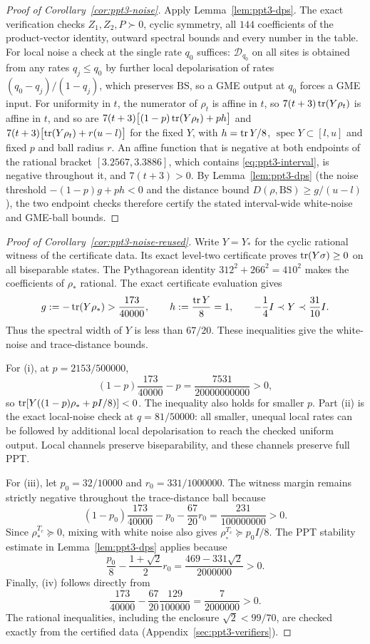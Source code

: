 \begin{proof}[Proof of Corollary~\ref{cor:ppt3-noise}]
Apply Lemma~\ref{lem:ppt3-dps}. The exact verification checks $Z_1,Z_2,P\succ0$, cyclic symmetry, all $144$
coefficients of the product-vector identity, outward spectral bounds and every number in the table. For local noise a
check at the single rate $q_0$ suffices: $\mathcal D_{q_0}$ on all sites is obtained from any rates $q_j\le q_0$ by further
local depolarisation of rates $(q_0-q_j)/(1-q_j)$, which preserves $\mathrm{BS}$, so a GME output at $q_0$ forces a GME
input. For uniformity in $t$, the numerator of $\rho_t$ is affine in $t$, so $7(t+3)\operatorname{tr}(Y\rho_t)$ is affine in $t$, and so are
$7(t+3)\bigl[(1-p)\operatorname{tr}(Y\rho_t)+ph\bigr]$ and $7(t+3)\bigl[\operatorname{tr}(Y\rho_t)+r(u-l)\bigr]$ for the fixed $Y$, with $h=\operatorname{tr} Y/8$,
$\operatorname{spec}Y\subset[l,u]$ and fixed $p$ and ball radius $r$. An affine function that is negative at both endpoints of the
rational bracket $[3.2567,3.3886]$, which contains \eqref{eq:ppt3-interval}, is negative throughout it, and $7(t+3)>0$. By
Lemma~\ref{lem:ppt3-dps} (the noise threshold $-(1-p)g+ph<0$ and the distance bound $D(\rho,\mathrm{BS})\ge g/(u-l)$), the two
endpoint checks therefore certify the stated interval-wide white-noise and GME-ball bounds.
\end{proof}

\begin{proof}[Proof of Corollary~\ref{cor:ppt3-noise-reused}]
Write $Y=Y_*$ for the cyclic rational witness of the
certificate data. Its exact level-two certificate proves $\operatorname{tr}(Y\sigma)\ge0$ on
all biseparable states. The Pythagorean identity
$312^2+266^2=410^2$ makes the coefficients of
$\rho_*$ rational. The exact certificate evaluation gives
\[
  g:=-\operatorname{tr}(Y\rho_*)>\frac{173}{40000},\qquad
  h:=\frac{\operatorname{tr} Y}{8}=1,\qquad
  -\frac14 I\prec Y\prec\frac{31}{10}I .
\]
Thus the spectral width of $Y$ is less than $67/20$.
These inequalities give the white-noise and trace-distance bounds.

For (i), at $p=2153/500000$,
\[
 (1-p)\frac{173}{40000}-p
 =\frac{7531}{20000000000}>0,
\]
so $\operatorname{tr}[Y((1-p)\rho_*+pI/8)]<0$. The inequality
also holds for smaller $p$. Part (ii) is the
exact local-noise check at $q=81/50000$:
all smaller, unequal local rates can be followed by
additional local depolarisation to reach the checked
uniform output. Local channels preserve biseparability,
and these channels preserve full PPT.

For (iii), let $p_0=32/10000$ and $r_0=331/1000000$.
The witness margin remains strictly negative throughout
the trace-distance ball because
\[
 (1-p_0)\frac{173}{40000}-p_0
           -\frac{67}{20}r_0
  =\frac{231}{100000000}>0.
\]
Since $\rho_*^{T_c}\succeq0$, mixing with white
noise also gives $\rho_\circ^{T_c}\succeq p_0I/8$.
The PPT stability estimate in
Lemma~\ref{lem:ppt3-dps} applies because
\[
 \frac{p_0}{8}-\frac{1+\sqrt2}{2}r_0
 =\frac{469-331\sqrt2}{2000000}>0.
\]
Finally, (iv) follows directly from
\[
 \frac{173}{40000}
 -\frac{67}{20}\frac{129}{100000}
 =\frac7{2000000}>0.
\]
The rational inequalities, including the enclosure
$\sqrt2<99/70$, are checked exactly from the certified data
(Appendix~\ref{sec:ppt3-verifiers}).
\end{proof}

